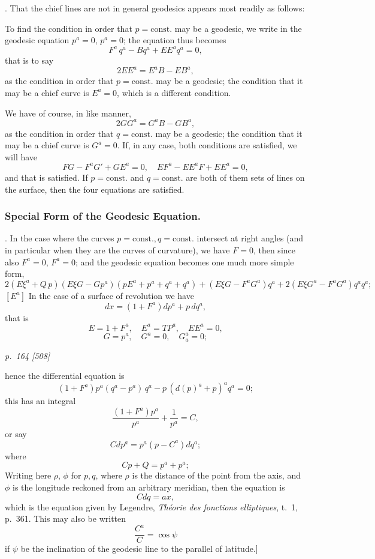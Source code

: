 \documentclass[11pt,a4paper]{book}
\begin{document}
. That the chief lines are not in general geodesics appears most readily as
follows:

To find the condition in order that $p = \mathrm{const.}$ may be a geodesic, we write in the
geodesic equation $p^a = 0$, $p^a = 0$; the equation thus becomes
\[
F^a\,q^a - Bq^a + EE^a q^a = 0,
\]
that is to say
\[
2EE^a = E^aB - EB^a,
\]
as the condition in order that $p = \mathrm{const.}$ may be a geodesic; the condition that it
may be a chief curve is $E^a = 0$, which is a different condition.

We have of course, in like manner,
\[
2GG^a = G^aB - GB^a,
\]
as the condition in order that $q = \mathrm{const.}$ may be a geodesic; the condition that it
may be a chief curve is $G^a = 0$. If, in any case, both conditions are satisfied,
we will have
\[
FG - F^aG' + GE^a = 0, \quad EF^a - EE^aF + EE^a = 0,
\]
and that is satisfied. If $p = \mathrm{const.}$ and $q = \mathrm{const.}$ are both of them
sets of lines on the surface, then the four equations are satisfied.

\subsubsection*{Special Form of the Geodesic Equation.}

. In the case where the curves $p = \mathrm{const.}, q = \mathrm{const.}$ intersect at right angles
(and in particular when they are the curves of curvature), we have $F = 0$, then since
also $F^a = 0$, $F^a = 0$; and the geodesic equation becomes one much more simple form,
\[
2(E\xi^a + Q\,p)(E\xi G - Gp^a)(p E^a + p^a + q^a + q^a) + (E\xi G - F^aG^a) q^a + 2(E\xi G^a - F^aG^a)q^aq^a;
\]
$[E^a]$ In the case of a surface of revolution we have
\[
dx = (1 + F^a) dp^a + p\,dq^a,
\]
that is
\[
E = 1 + F^a, \quad E^a = TP^a, \quad EE^a = 0,
\]
\[
G = p^a, \quad G^a = 0, \quad G_a^a = 0;
\]

\clearpage

\bigskip
\textit{p.~164 [508]}
\smallskip

\noindent
hence the differential equation is
\[
(1 + F^a) p^a (q^a - p^a)\,q^a - p\,(d(p)^a + p)^a q^a = 0;
\]
this has an integral
\[
\frac{(1 + F^a) p^a}{p^a} + \frac{1}{p^a} = C,
\]
or say
\[
C dp^a = p^a (p - C^a) dq^a;
\]
where
\[
Cp + Q = p^a + p^a;
\]
Writing here $\rho$, $\phi$ for $p, q$, where $\rho$ is the distance of the point from the axis,
and $\phi$ is the longitude reckoned from an arbitrary meridian, then the equation is
\[
Cdq = ax,
\]
which is the equation given by Legendre, \textit{Th\'eorie des fonctions elliptiques}, t.\ 1, p.\ 361.
This may also be written
\[
\frac{C^a}{C} = \cos\psi
\]
if $\psi$ be the inclination of the geodesic line to the parallel of latitude.]
\end{document}
